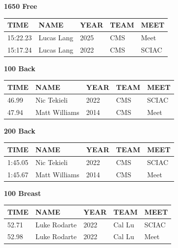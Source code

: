 \begin{table}[H]
\centering
\begin{minipage}[t]{0.48\textwidth}
\centering
\textbf{1650 Free}\\[0.1cm]
\begin{tabular}{@{}p{1.8cm}p{2.8cm}p{1.2cm}p{1.4cm}p{1.4cm}@{}}
\hline
    \textbf{TIME} & \textbf{NAME} & \textbf{YEAR} & \textbf{TEAM} & \textbf{MEET} \\
\hline
    15:22.23 & Lucas Lang & 2025 & CMS & Meet \\
    15:17.24 & Lucas Lang & 2022 & CMS & SCIAC \\
\hline
\end{tabular}
\end{minipage}\hfill
\begin{minipage}[t]{0.48\textwidth}
\centering
\textbf{100 Back}\\[0.1cm]
\begin{tabular}{@{}p{1.8cm}p{2.8cm}p{1.2cm}p{1.4cm}p{1.4cm}@{}}
\hline
    \textbf{TIME} & \textbf{NAME} & \textbf{YEAR} & \textbf{TEAM} & \textbf{MEET} \\
\hline
    46.99 & Nic Tekieli & 2022 & CMS & SCIAC \\
    47.94 & Matt Williams & 2014 & CMS & Meet \\
\hline
\end{tabular}
\end{minipage}
\end{table}

\begin{table}[H]
\centering
\begin{minipage}[t]{0.48\textwidth}
\centering
\textbf{200 Back}\\[0.1cm]
\begin{tabular}{@{}p{1.8cm}p{2.8cm}p{1.2cm}p{1.4cm}p{1.4cm}@{}}
\hline
    \textbf{TIME} & \textbf{NAME} & \textbf{YEAR} & \textbf{TEAM} & \textbf{MEET} \\
\hline
    1:45.05 & Nic Tekieli & 2022 & CMS & SCIAC \\
    1:45.67 & Matt Williams & 2014 & CMS & Meet \\
\hline
\end{tabular}
\end{minipage}\hfill
\begin{minipage}[t]{0.48\textwidth}
\centering
\textbf{100 Breast}\\[0.1cm]
\begin{tabular}{@{}p{1.8cm}p{2.8cm}p{1.2cm}p{1.4cm}p{1.4cm}@{}}
\hline
    \textbf{TIME} & \textbf{NAME} & \textbf{YEAR} & \textbf{TEAM} & \textbf{MEET} \\
\hline
    52.71 & Luke Rodarte & 2022 & Cal Lu & SCIAC \\
    52.98 & Luke Rodarte & 2022 & Cal Lu & Meet \\
\hline
\end{tabular}
\end{minipage}
\end{table}

